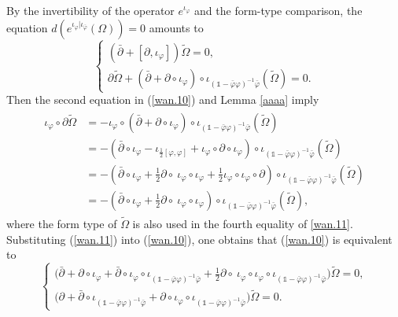 \documentclass[12pt]{amsart}
\numberwithin{equation}{section}
\renewcommand{\1}{\mathds{1}}
\renewcommand{\>}{\rightarrow}
\newcommand{\p}{\partial}
\def\p{\partial}
\def\b{\bar}
\begin{document}
By the invertibility of the operator $e^{\iota_{\varphi}}$ and the
form-type comparison, the equation
$d(e^{\iota_{\varphi}|\iota_{\b{\varphi}}}(\Omega))=0$ amounts to
 \begin{equation}\label{wan.10}
    \begin{cases}
      (\b{\p}+[\p, \iota_{\varphi}])\tilde{\Omega}=0,\\
      \p\tilde{\Omega}+(\b{\p}+\p\circ \iota_{\varphi})\circ \iota_{(\1-\b{\varphi}\varphi)^{-1}\b{\varphi}}(\tilde{\Omega})=0.
    \end{cases}
 \end{equation}
Then the second equation in (\ref{wan.10}) and Lemma \ref{aaaa}
imply
 \begin{align}\label{wan.11}
 \begin{split}
   \iota_{\varphi}\circ \p\tilde{\Omega}&=-\iota_{\varphi}\circ(\b{\p}+\p\circ \iota_{\varphi})\circ\iota_{(\1-\b{\varphi}\varphi)^{-1}\b{\varphi}}(\tilde{\Omega})\\
   &=-(\b{\p}\circ \iota_{\varphi}-\iota_{\frac{1}{2}[\varphi,\varphi]}+\iota_{\varphi}\circ\p\circ \iota_{\varphi})\circ \iota_{(\1-\b{\varphi}\varphi)^{-1}\b{\varphi}}(\tilde{\Omega})\\
   &=-(\b{\p}\circ \iota_{\varphi}+\frac{1}{2}\p\circ\ \iota_{\varphi}\circ \iota_{\varphi}+\frac{1}{2}\iota_{\varphi}\circ \iota_{\varphi}\circ\p)\circ \iota_{(\1-\b{\varphi}\varphi)^{-1}\b{\varphi}}(\tilde{\Omega})\\
   &=-(\b{\p}\circ \iota_{\varphi}+\frac{1}{2}\p\circ\ \iota_{\varphi}\circ \iota_{\varphi})\circ
   \iota_{(\1-\b{\varphi}\varphi)^{-1}\b{\varphi}}(\tilde{\Omega}),
   \end{split}
 \end{align}
where the form type of $\tilde{\Omega}$ is also used in the fourth
equality of \eqref{wan.11}. Substituting (\ref{wan.11}) into
(\ref{wan.10}), one obtains that (\ref{wan.10}) is equivalent to
\begin{equation}\label{wan.12}
    \begin{cases}
      \big(\b{\p}+\p\circ \iota_{\varphi}+\b{\p}\circ \iota_{\varphi}\circ \iota_{(\1-\b{\varphi}\varphi)^{-1}\b{\varphi}}+\frac{1}{2}\p\circ\ \iota_{\varphi}\circ \iota_{\varphi}\circ \iota_{(\1-\b{\varphi}\varphi)^{-1}\b{\varphi}}\big)\tilde{\Omega}=0,\\
      \big(\p+\b{\p}\circ \iota_{(\1-\b{\varphi}\varphi)^{-1}\b{\varphi}}+\p\circ \iota_{\varphi}\circ \iota_{(\1-\b{\varphi}\varphi)^{-1}\b{\varphi}}\big)\tilde{\Omega}=0.
    \end{cases}
\end{equation}
\end{document}
